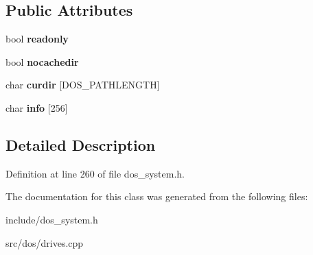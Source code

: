 \subsection*{Public Attributes}
\begin{DoxyCompactItemize}
\item 
\hypertarget{classDOS__Drive_aa7a3f21acf8787c1bad16d2c4fb5c53c}{bool {\bfseries readonly}}\label{classDOS__Drive_aa7a3f21acf8787c1bad16d2c4fb5c53c}

\item 
\hypertarget{classDOS__Drive_ab8a268c6350773fa0e8b8c000b691447}{bool {\bfseries nocachedir}}\label{classDOS__Drive_ab8a268c6350773fa0e8b8c000b691447}

\item 
\hypertarget{classDOS__Drive_a781fd315606de345f8eab325c2a17c2e}{char {\bfseries curdir} \mbox{[}D\-O\-S\-\_\-\-P\-A\-T\-H\-L\-E\-N\-G\-T\-H\mbox{]}}\label{classDOS__Drive_a781fd315606de345f8eab325c2a17c2e}

\item 
\hypertarget{classDOS__Drive_a3e2b1d7526c099ba38ba991b9d2623e1}{char {\bfseries info} \mbox{[}256\mbox{]}}\label{classDOS__Drive_a3e2b1d7526c099ba38ba991b9d2623e1}

\end{DoxyCompactItemize}


\subsection{Detailed Description}


Definition at line 260 of file dos\-\_\-system.\-h.



The documentation for this class was generated from the following files\-:\begin{DoxyCompactItemize}
\item 
include/dos\-\_\-system.\-h\item 
src/dos/drives.\-cpp\end{DoxyCompactItemize}
